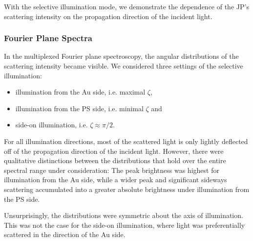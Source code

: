 \documentclass[10pt]{article}
\begin{document}

With the selective illumination mode, we demonstrate the dependence of the JP's scattering intensity on the propagation direction of the incident light. 




\subsubsection*{Fourier Plane Spectra}

In the multiplexed Fourier plane spectroscopy, the angular distributions of the scattering intensity became visible. 
We considered three settings of the selective illumination: 
\begin{itemize}
    \item illumination from the Au side, i.e. maximal $\zeta$,
    \item illumination from the PS side, i.e. minimal $\zeta$ and
    \item side-on illumination, i.e. $\zeta \approx \pi/2$.
\end{itemize}

For all illumination directions, most of the scattered light is only lightly deflected off of the propagation direction of the incident light. 
However, there were qualitative distinctions between the distributions that hold over the entire spectral range under consideration:
The peak brightness was highest for illumination from the Au side, while a wider peak and significant sideways scattering accumulated into a greater absolute brightness under illumination from the PS side. 

Unsurprisingly, the distributions were symmetric about the axis of illumination. 
This was not the case for the side-on illumination, where light was preferentially scattered in the direction of the Au side. 




\end{document}
